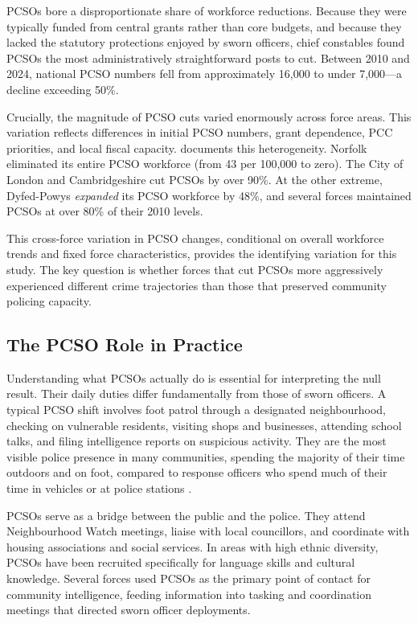 \documentclass[12pt]{article}
\begin{document}
PCSOs bore a disproportionate share of workforce reductions. Because they were typically funded from central grants rather than core budgets, and because they lacked the statutory protections enjoyed by sworn officers, chief constables found PCSOs the most administratively straightforward posts to cut. Between 2010 and 2024, national PCSO numbers fell from approximately 16,000 to under 7,000---a decline exceeding 50\%.

Crucially, the magnitude of PCSO cuts varied enormously across force areas. This variation reflects differences in initial PCSO numbers, grant dependence, PCC priorities, and local fiscal capacity.  documents this heterogeneity. Norfolk eliminated its entire PCSO workforce (from 43 per 100,000 to zero). The City of London and Cambridgeshire cut PCSOs by over 90\%. At the other extreme, Dyfed-Powys \textit{expanded} its PCSO workforce by 48\%, and several forces maintained PCSOs at over 80\% of their 2010 levels.

This cross-force variation in PCSO changes, conditional on overall workforce trends and fixed force characteristics, provides the identifying variation for this study. The key question is whether forces that cut PCSOs more aggressively experienced different crime trajectories than those that preserved community policing capacity.

\subsection{The PCSO Role in Practice}

Understanding what PCSOs actually do is essential for interpreting the null result. Their daily duties differ fundamentally from those of sworn officers. A typical PCSO shift involves foot patrol through a designated neighbourhood, checking on vulnerable residents, visiting shops and businesses, attending school talks, and filing intelligence reports on suspicious activity. They are the most visible police presence in many communities, spending the majority of their time outdoors and on foot, compared to response officers who spend much of their time in vehicles or at police stations \citep{hmicfrs2019peel}.

PCSOs serve as a bridge between the public and the police. They attend Neighbourhood Watch meetings, liaise with local councillors, and coordinate with housing associations and social services. In areas with high ethnic diversity, PCSOs have been recruited specifically for language skills and cultural knowledge. Several forces used PCSOs as the primary point of contact for community intelligence, feeding information into tasking and coordination meetings that directed sworn officer deployments.
\end{document}
